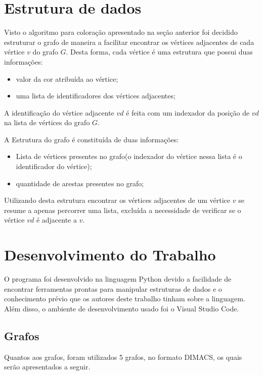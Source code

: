 \documentclass[12pt,openright,oneside,a4paper,brazil]{abntex2}
\begin{document}
\section{Estrutura de dados}
Visto o algoritmo para coloração apresentado na seção anterior foi decidido estruturar o grafo de maneira a facilitar encontrar os vértices adjacentes de cada vértice $v$  do grafo $G$. Desta forma, cada vértice é uma estrutura que possui duas informações:
\begin{itemize}
	\item valor da cor atribuída ao vértice;
	\item uma lista de identificadores dos vértices adjacentes;
\end{itemize}

A identificação do vértice adjacente $vd$ é feita com um indexador da posição de $vd$ na lista de vértices do grafo $G$.

A Estrutura do grafo é constituída de duas informações: 
\begin{itemize}
	\item Lista de vértices presentes no grafo(o indexador do vértice nessa lista é o identificador do vértice);
	\item quantidade de arestas presentes no grafo;
\end{itemize}

Utilizando desta estrutura encontrar os vértices adjacentes de um vértice $v$ se resume a apenas percorrer uma lista, excluída a necessidade de verificar se o vértice $vd$ é adjacente a $v$.

\section{Desenvolvimento do Trabalho}
O programa foi desenvolvido na linguagem Python devido a facilidade de encontrar ferramentas prontas para manipular estruturas de dados e o conhecimento prévio que os autores deste trabalho tinham sobre a linguagem. Além disso, o ambiente de desenvolvimento  usado foi o Visual Studio Code.


\subsection{Grafos}   
Quantos aos grafos, foram utilizados 5 grafos, no formato DIMACS, os quais serão apresentados a seguir. 
\end{document}
